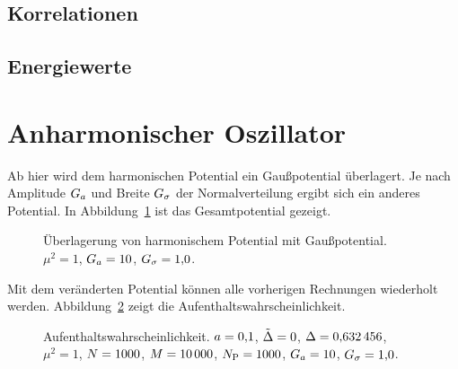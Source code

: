\subsection{Korrelationen}

\subsection{Energiewerte}

\section{Anharmonischer Oszillator}

Ab hier wird dem harmonischen Potential ein Gaußpotential überlagert. Je nach
Amplitude $G_a$ und Breite $G_\sigma$ der Normalverteilung ergibt
sich ein anderes Potential. In Abbildung~\ref{fig:gausspotential} ist das
Gesamtpotential gezeigt.

\begin{figure}[htbp]
    \centering
    \caption{%
        Überlagerung von harmonischem Potential mit Gaußpotential. $\mu^2 =
        \num{1}$, $G_a = \num{10}$, $G_\sigma = \num{1.0}$.
    }
    \label{fig:gausspotential}
\end{figure}

Mit dem veränderten Potential können alle vorherigen Rechnungen wiederholt
werden. Abbildung~\ref{fig:histogram_gauss} zeigt die
Aufenthaltswahrscheinlichkeit.

\begin{figure}[htbp]
    \centering
    \caption{%
        Aufenthaltswahrscheinlichkeit. $a = \num{0.1}$,
        $\tilde \Delta = \num{0}$, $\Delta = \num{0.632456}$, $\mu^2 =
        \num{1}$, $N = \num{1000}$, $M = \num{10000}$,
        $N_\text P = \num{1000}$, $G_a = \num{10}$,
        $G_\sigma = \num{1.0}$.
    }
    \label{fig:histogram_gauss}
\end{figure}


